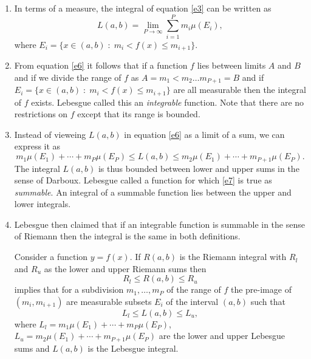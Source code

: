 \documentclass{article}
\theoremstyle{plain}
\numberwithin{thm}{section}
\theoremstyle{plain}
\numberwithin{prop}{section}
\theoremstyle{definition}
\numberwithin{defn}{section}
\theoremstyle{remark}
\begin{document}
\begin{enumerate}
\item In terms of a measure, the integral of equation \eqref{e3} can be 
written as 
\begin{equation}\label{e6}
L(a, b) = \lim_{P \rightarrow \infty}\sum_{i=1}^Pm_i\mu(E_i),
\end{equation}
where $E_i = \{x \in (a, b)\;:\; m_i < f(x) \le m_{i+1}\}$. 

\item From equation \eqref{e6} it follows that if a function $f$ lies between
limits $A$ and $B$ and if we divide the range of $f$ as $A = m_1 < m_2 \ldots
m_{P+1} = B$ and if $E_i = \{x \in (a, b)\;:\; m_i < f(x) \le m_{i+1}\}$ are
all measurable then the integral of $f$ exists. Lebesgue called this an
\emph{integrable} function. Note that there are no restrictions on $f$ except
that its range is bounded.

\item Instead of vieweing $L(a, b)$ in equation \eqref{e6} as a limit of a sum,
we can express it as
\begin{equation}\label{e7}
m_1\mu(E_1) + \cdots + m_P\mu(E_P) \le L(a, b) \le m_2\mu(E_1) + \cdots +
m_{P+1}\mu(E_P).
\end{equation}
The integral $L(a, b)$ is thus bounded between lower and upper sums in the 
sense of Darboux. Lebesgue called a function for which \eqref{e7} is true as 
\emph{summable}. An integral of a summable function lies between the upper and
lower integrals.

\item Lebesgue then claimed that if an integrable function is summable in the
sense of Riemann then the integral is the same in both definitions.

Consider a function $y = f(x)$. If $R(a, b)$ is the Riemann integral with 
$R_l$ and $R_u$ as the lower and upper Riemann sums then 
\begin{equation}\label{e8}
R_l \le R(a, b) \le R_u
\end{equation}
implies that for a subdivision $m_1, \ldots, m_P$ of the range of $f$ the 
pre-image of $(m_i, m_{i+1})$ are measurable subsets $E_i$ of the interval 
$(a, b)$ such that 
\begin{equation}\label{e9}
L_l \le L(a, b) \le L_u,
\end{equation} 
where $L_l = m_1\mu(E_1) + \cdots + m_P\mu(E_P)$, $L_u = m_2\mu(E_1) + \cdots 
+ m_{P+1}\mu(E_P)$ are the lower and upper Lebesgue sums and $L(a, b)$ is the 
Lebesgue integral.


\end{enumerate}
\end{document}
